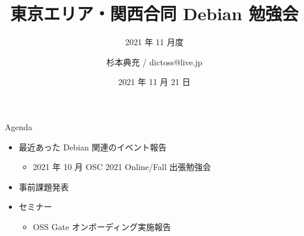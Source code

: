 \title{東京エリア・関西合同 Debian 勉強会}
\subtitle{2021 年 11 月度} %
\author{杉本典充 / dictoss@live.jp}
\date{2021 年 11 月 21 日}



\begin{frame}
\titlepage{}
\end{frame}


\begin{frame}{Agenda}
 \begin{minipage}[t]{0.45\hsize}
  \begin{itemize}
  \item 最近あった Debian 関連のイベント報告
    \begin{itemize}
    \item 2021 年 10 月 OSC 2021 Online/Fall 出張勉強会
    \end{itemize}
  \item 事前課題発表
  \end{itemize}
 \end{minipage}
 \begin{minipage}[t]{0.45\hsize}
   \begin{itemize}
   \item セミナー
     \begin{itemize}
      \item OSS Gate オンボーディング実施報告
     \end{itemize}
  \end{itemize}
 \end{minipage}
\end{frame}

